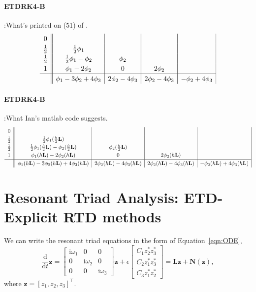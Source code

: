 \documentclass{article}
\newcommand{\eps}{\epsilon}
\newcommand{\bb}[1]{\mathbf{#1}}
\newcommand{\ddt}{\frac{\mathrm{d}}{\mathrm{d}t}}
\newcommand{\imag}{\text{i}}
\theoremstyle{definition}
\begin{document}
\paragraph{ETDRK4-B}:What's printed on (51) of \cite{Krogstad2005}.
\[
\renewcommand\arraystretch{1.2}
\begin{array}
{c||c|c|c|c|c}
0& & & & \\
\frac{1}{2}& \frac{1}{2}\phi_1 &  & & \\
\frac{1}{2} &  \frac{1}{2}\phi_1 - \phi_2  & \phi_2& &\\ 
1 &  \phi_1 - 2\phi_2 & 0 & 2\phi_2 & \\\hline
& \phi_1-3\phi_2+4\phi_3 &2\phi_2 -4\phi_3 &2\phi_2 -4\phi_3 & -\phi_2 + 4\phi_3
\end{array}
\]


\paragraph{ETDRK4-B}:What Ian's matlab code suggests.
\[
\renewcommand\arraystretch{1.2}
\begin{array}
{c||c|c|c|c|c}
0& & & & \\
\frac{1}{2}& \frac{1}{2}\phi_1(\frac{h}{2}\bb{L}) &  & & \\
\frac{1}{2} & \frac{1}{2}\phi_1(\frac{h}{2}\bb{L})-\phi_2(\frac{h}{2}\bb{L})  &\phi_2(\frac{h}{2}\bb{L}) & &\\ 
1 &  \phi_1(h\bb{L})-2\phi_2(h\bb{L}) & 0 & 2\phi_2(h\bb{L}) & \\\hline
& \phi_1(h\bb{L})-3\phi_2(h\bb{L})+4\phi_3(h\bb{L})  &2\phi_2(h\bb{L}) -4\phi_3(h\bb{L})&2\phi_2(h\bb{L}) -4\phi_3(h\bb{L}) & -\phi_2(h\bb{L}) + 4\phi_3(h\bb{L})
\end{array}
\]

\section{Resonant Triad Analysis: ETD-Explicit RTD methods}

We can write the resonant triad equations in the form of Equation~\ref{eqn:ODE}, 
\[
\ddt \bb{z} = \begin{bmatrix}
\imag\omega_1 & 0 & 0\\
0 & \imag\omega_2 & 0\\
0 & 0 & \imag\omega_3
\end{bmatrix}\bb{z} + \eps\begin{bmatrix}
C_1 z_2^*z_3^*\\
C_{2}z_1^*z_3^*\\
C_{3}z_1^*z_2^*
\end{bmatrix} =\bb{Lz} + \bb{N}(\bb{z})\label{eqn:RTvec},
\]
where $\bb{z}=[z_1,z_2,z_3]^{\top}$.
\end{document}

